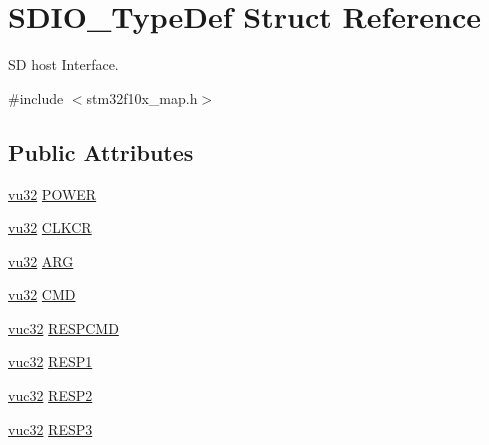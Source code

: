 \hypertarget{struct_s_d_i_o___type_def}{}\section{S\+D\+I\+O\+\_\+\+Type\+Def Struct Reference}
\label{struct_s_d_i_o___type_def}


SD host Interface.  




{\ttfamily \#include $<$stm32f10x\+\_\+map.\+h$>$}

\subsection*{Public Attributes}
\begin{DoxyCompactItemize}
\item 
\hyperlink{agilefox_2library_2inc_2stm32f10x__type_8h_a6e2761f0a1011f84ed96b946f2c8a563}{vu32} \hyperlink{struct_s_d_i_o___type_def_a7a5cac785f2196c67f2b3f8018d42327}{P\+O\+W\+ER}
\item 
\hyperlink{agilefox_2library_2inc_2stm32f10x__type_8h_a6e2761f0a1011f84ed96b946f2c8a563}{vu32} \hyperlink{struct_s_d_i_o___type_def_a6076fc70af4f48cbd2bdace51a0e9345}{C\+L\+K\+CR}
\item 
\hyperlink{agilefox_2library_2inc_2stm32f10x__type_8h_a6e2761f0a1011f84ed96b946f2c8a563}{vu32} \hyperlink{struct_s_d_i_o___type_def_a4f23861b179c46f4aa9b5fef9f7c2c40}{A\+RG}
\item 
\hyperlink{agilefox_2library_2inc_2stm32f10x__type_8h_a6e2761f0a1011f84ed96b946f2c8a563}{vu32} \hyperlink{struct_s_d_i_o___type_def_a324ba84e6ff0e47d805d676757e2cd4a}{C\+MD}
\item 
\hyperlink{agilefox_2library_2inc_2stm32f10x__type_8h_aafafa689bea126b0ac382c789206f51e}{vuc32} \hyperlink{struct_s_d_i_o___type_def_a68860550d4d87d906772e782941a69ec}{R\+E\+S\+P\+C\+MD}
\item 
\hyperlink{agilefox_2library_2inc_2stm32f10x__type_8h_aafafa689bea126b0ac382c789206f51e}{vuc32} \hyperlink{struct_s_d_i_o___type_def_ab755bf1f0b86e7b89e39653f9949bbe9}{R\+E\+S\+P1}
\item 
\hyperlink{agilefox_2library_2inc_2stm32f10x__type_8h_aafafa689bea126b0ac382c789206f51e}{vuc32} \hyperlink{struct_s_d_i_o___type_def_a3f6725c3b05aec55920a6f9082044ff0}{R\+E\+S\+P2}
\item 
\hyperlink{agilefox_2library_2inc_2stm32f10x__type_8h_aafafa689bea126b0ac382c789206f51e}{vuc32} \hyperlink{struct_s_d_i_o___type_def_a7d035d0dd59d2355af287a7b8b8f4d21}{R\+E\+S\+P3}

\end{DoxyCompactItemize}
